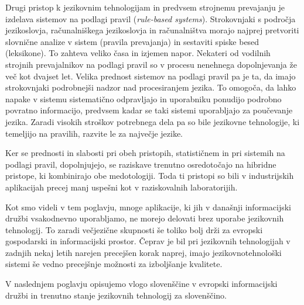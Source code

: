 \begin{multicols}{2}
Drugi pristop k jezikovnim tehnologijam in predvsem stroj\-nemu prevajanju je izdelava sistemov na podlagi pravil (\textit{rule-based systems}). Strokovnjaki s področja jezikoslovja, računalniškega jezikoslovja in računalništva morajo naj\-prej pretvoriti slovnične analize v sistem (pravila prevajanja) in sestaviti spiske besed (leksikone). To zah\-teva veliko časa in izjemen napor. Nekateri od vodilnih stroj\-nih prevajalnikov na podlagi pravil so v procesu nenehnega dopolnjevanja že več kot dvajset let. Velika prednost sistemov na podlagi pravil pa je ta, da imajo strokovnjaki podrobnejši nadzor nad procesi\-ranjem jezika. To omogoča, da lahko napake v sistemu  sistema\-tično odprav\-ljajo in uporabniku ponudijo podrobno povratno informacijo, predvsem kadar se taki sistemi uporab\-ljajo za poučevanje jezika. Zaradi visokih stroškov potrebnega dela pa so bile jezikovne tehnologije, ki temeljijo na pravilih, razvite le za naj\-večje jezike. %

Ker se prednosti in slabosti pri obeh pristopih, statističnem in pri sistemih na podlagi pravil, dopolnjujejo, se raziskave trenutno osredotočajo na hibridne pristope, ki kombinirajo obe medotologiji. Toda ti pristopi so bili v industrijskih aplikacijah precej manj uspešni kot v raziskovalnih laboratorijih. %

Kot smo videli v tem poglavju, mnoge aplikacije, ki jih v današnji informacij\-ski družbi vsakodnevno uporab\-ljamo, ne morejo delovati brez uporabe jezikovnih tehnologij. To zaradi večjezične skupnosti še toliko bolj drži za evropski gospodarski in informacij\-ski prostor. Čeprav je bil pri jezikovnih tehnologijah v zadnjih nekaj letih narejen precejšen korak naprej, imajo jezikovnotehnološki sistemi še vedno precejšnje možnosti za izboljšanje kvalitete. 
\columnbreak

V naslednjem poglavju opisujemo vlogo slovenščine v evropski informacij\-ski družbi in trenutno stanje jezikovnih tehnologij za slovenščino.
\end{multicols}

\clearpage



